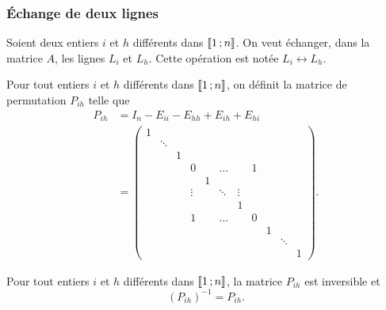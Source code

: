 \subsubsection{Échange de deux lignes}
Soient deux entiers \(i\) et \(h\) différents dans \(\mathopen{\llbracket}1\mathclose{}\mathpunct{};n\mathclose{\rrbracket}\). 
On veut échanger, dans la matrice \(A\), les lignes \(L_i\) et \(L_h\). Cette 
opération est notée \(L_i \leftrightarrow L_h\).
\begin{defdef}
  Pour tout entiers \(i\) et \(h\) différents dans \(\mathopen{\llbracket}1\mathclose{}\mathpunct{};n\mathclose{\rrbracket}\), 
  on définit la matrice de permutation \(P_{ih}\) telle que
  \begin{align}
    P_{ih} &= I_n - E_{ii}-E_{hh} +E_{ih}+E_{hi}\\
           & = \begin{pmatrix}
             1&        &  &        &   &        &        &   &   &        & \\
              & \ddots &  &        &   &        &        &   &   &        & \\
              &        &1 &        &   &        &        &   &   &        & \\
              &        &  & 0      &   & \ldots &        & 1 &   &        & \\
              &        &  &        & 1 &        &        &   &   &        & \\
              &        &  & \vdots &   & \ddots & \vdots &   &   &        & \\
              &        &  &        &   &        & 1      &   &   &        & \\
              &        &  & 1      &   & \ldots &        & 0 &   &        & \\
              &        &  &        &   &        &        &   & 1 &        & \\
              &        &  &        &   &        &        &   &   & \ddots & \\
              &        &  &        &   &        &        &   &   &        & 1
           \end{pmatrix}.
  \end{align}
\end{defdef}
%
\begin{prop}
  Pour tout entiers \(i\) et \(h\) différents dans \(\mathopen{\llbracket}1\mathclose{}\mathpunct{};n\mathclose{\rrbracket}\), 
  la matrice \(P_{ih}\) est inversible et
  \begin{equation}
    (P_{ih})^{-1} = P_{ih}.
  \end{equation}
\end{prop}
